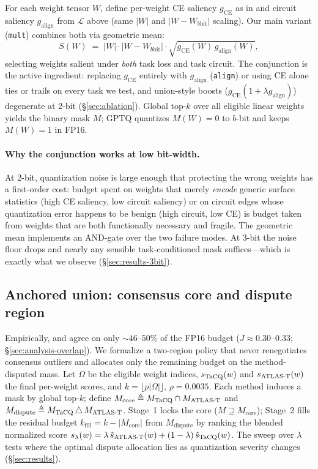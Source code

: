For each weight tensor $W$, define per-weight CE saliency $g_{\text{CE}}$ as in
\baseline{} and circuit saliency $g_{\text{align}}$ from $\mathcal{L}$ above
(same $|W|$ and $|W - W_{b\text{bit}}|$ scaling). Our main variant
(\texttt{mult}) combines both via geometric mean:
\begin{equation}
\label{eq:mult}
S(W) \;=\; |W| \cdot |W - W_{b\text{bit}}| \cdot \sqrt{g_{\text{CE}}(W)\, g_{\text{align}}(W)},
\end{equation}
selecting weights salient under \emph{both} task loss and task circuit. The
conjunction is the active ingredient: replacing $g_{\text{CE}}$ entirely with
$g_{\text{align}}$ (\texttt{align}) or using CE alone ties or trails on every
task we test, and union-style boosts
($g_{\text{CE}}(1 + \lambda g_{\text{align}})$) degenerate at 2-bit
(\S\ref{sec:ablation}). Global top-$k$ over all eligible linear weights yields
the binary mask $M$; GPTQ quantizes $M(W){=}0$ to $b$-bit and keeps
$M(W){=}1$ in FP16.

\paragraph{Why the conjunction works at low bit-width.}
At 2-bit, quantization noise is large enough that protecting the wrong weights
has a first-order cost: budget spent on weights that merely \emph{encode}
generic surface statistics (high CE saliency, low circuit saliency) or on
circuit edges whose quantization error happens to be benign (high circuit, low
CE) is budget taken from weights that are both functionally necessary and
fragile. The geometric mean implements an AND-gate over the two failure modes.
At 3-bit the noise floor drops and nearly any sensible task-conditioned mask
suffices---which is exactly what we observe (\S\ref{sec:results-3bit}).

\subsection{Anchored union: consensus core and dispute region}
\label{sec:method-anchored}

Empirically, \baseline{} and \method{} agree on only ${\sim}46$--$50\%$ of the
FP16 budget ($J{\approx}0.30$--$0.33$; \S\ref{sec:analysis-overlap}). We
formalize a two-region policy that never renegotiates consensus outliers and
allocates only the remaining budget on the method-disputed mass. Let $\Omega$
be the eligible weight indices, $s_{\text{TaCQ{}}}(w)$ and
$s_{\text{ATLAS-T{}}}(w)$ the final per-weight scores, and
$k = \lfloor \rho |\Omega| \rfloor$, $\rho{=}0.0035$. Each method induces a
mask by global top-$k$; define
$M_{\text{core}} \triangleq M_{\text{TaCQ{}}} \cap M_{\text{ATLAS-T{}}}$
and
$M_{\text{dispute}} \triangleq M_{\text{TaCQ{}}} \,\triangle\, M_{\text{ATLAS-T{}}}$.
Stage~1 locks the core ($M \supseteq M_{\text{core}}$); Stage~2 fills the
residual budget $k_{\text{fill}} = k - |M_{\text{core}}|$ from
$M_{\text{dispute}}$ by ranking the blended normalized score
$s_\lambda(w) = \lambda\, \hat{s}_{\text{ATLAS-T{}}}(w) + (1-\lambda)\, \hat{s}_{\text{TaCQ{}}}(w)$.
The sweep over $\lambda$ tests where the optimal dispute allocation lies as
quantization severity changes (\S\ref{sec:results}).

